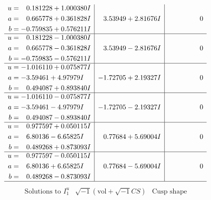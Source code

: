 \documentclass[1p]{elsarticle_modified}
\theoremstyle{definition}
\newcommand{\I}{\sqrt{-1}}
\begin{document}
$$\begin{array}{c|c|c}
\begin{aligned}
u &= \phantom{-}0.181228 + 1.000380 I \\
a &= \phantom{-}0.665778 + 0.361828 I \\
b &= -0.759835 + 0.576211 I\end{aligned}
 & \phantom{-}3.53949 + 2.81676 I & \phantom{-0.000000 } 0 \\ \hline\begin{aligned}
u &= \phantom{-}0.181228 - 1.000380 I \\
a &= \phantom{-}0.665778 - 0.361828 I \\
b &= -0.759835 - 0.576211 I\end{aligned}
 & \phantom{-}3.53949 - 2.81676 I & \phantom{-0.000000 } 0 \\ \hline\begin{aligned}
u &= -1.016110 + 0.075877 I \\
a &= -3.59461 + 4.97979 I \\
b &= \phantom{-}0.494087 + 0.893840 I\end{aligned}
 & -1.72705 + 2.19327 I & \phantom{-0.000000 } 0 \\ \hline\begin{aligned}
u &= -1.016110 - 0.075877 I \\
a &= -3.59461 - 4.97979 I \\
b &= \phantom{-}0.494087 - 0.893840 I\end{aligned}
 & -1.72705 - 2.19327 I & \phantom{-0.000000 } 0 \\ \hline\begin{aligned}
u &= \phantom{-}0.977597 + 0.050115 I \\
a &= \phantom{-}6.80136 - 6.65825 I \\
b &= \phantom{-}0.489268 + 0.873093 I\end{aligned}
 & \phantom{-}0.77684 + 5.69004 I & \phantom{-0.000000 } 0 \\ \hline\begin{aligned}
u &= \phantom{-}0.977597 - 0.050115 I \\
a &= \phantom{-}6.80136 + 6.65825 I \\
b &= \phantom{-}0.489268 - 0.873093 I\end{aligned}
 & \phantom{-}0.77684 - 5.69004 I & \phantom{-0.000000 } 0\\
 \hline 
 \end{array}$$\newpage$$\begin{array}{c|c|c}  
\text{Solutions to }I^u_{1}& \I (\text{vol} + \sqrt{-1}CS) & \text{Cusp shape}\\

\end{array}$$
\end{document}
